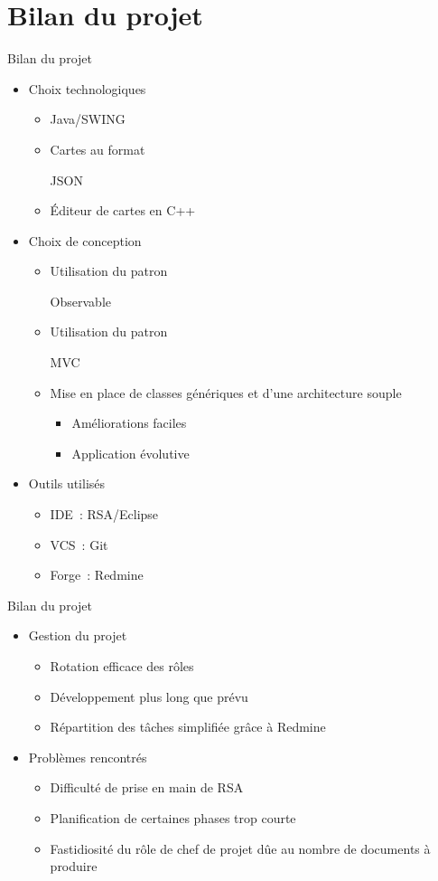 \section{Bilan du projet}
\begin{frame}{Bilan du projet}
\begin{itemize}
	\item Choix technologiques
	\begin{itemize}
		\item Java/SWING
		\item Cartes au format \begin{em}JSON\end{em}
		\item Éditeur de cartes en C++
	\end{itemize}
	\item Choix de conception
	\begin{itemize}
		\item Utilisation du patron \begin{em}Observable\end{em}
		\item Utilisation du patron \begin{em}MVC\end{em}
		\item Mise en place de classes génériques et d'une architecture souple
		\begin{itemize}
			\item Améliorations faciles
			\item Application évolutive
		\end{itemize}
	\end{itemize}
	\item Outils utilisés
	\begin{itemize}
		\item IDE~: RSA/Eclipse
		\item VCS~: Git
		\item Forge~: Redmine
	\end{itemize}
\end{itemize}
\end{frame}
\begin{frame}{Bilan du projet}
\begin{itemize}
	\item Gestion du projet
	\begin{itemize}
		\item Rotation efficace des rôles
		\item Développement plus long que prévu
		\item Répartition des tâches simplifiée grâce à Redmine
	\end{itemize}
	\item Problèmes rencontrés
	\begin{itemize}
		\item Difficulté de prise en main de RSA
		\item Planification de certaines phases trop courte
		\item Fastidiosité du rôle de chef de projet dûe au nombre de documents à produire
	\end{itemize}
\end{itemize}
\end{frame}
